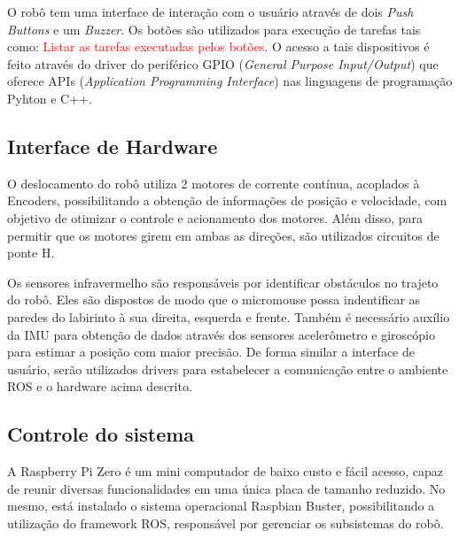 O robô tem uma interface de interação com o usuário através de dois \textit{Push Buttons} e um \textit{Buzzer}. Os botões são utilizados para execução de tarefas tais como: \textcolor{red}{Listar as tarefas executadas pelos botões}. O acesso a tais dispositivos é feito através do driver do periférico GPIO (\textit{General Purpose Input/Output}) que oferece APIs (\textit{Application Programming Interface}) nas linguagens de programação Pyhton e C++.

\subsection{Interface de Hardware}
\label{ssec:interface_de_hardware}
O deslocamento do robô utiliza 2 motores de corrente contínua, acoplados à Encoders, possibilitando a obtenção de informações de posição e velocidade, com objetivo de otimizar o controle e acionamento dos motores. Além disso, para permitir que os motores girem em ambas as direções, são utilizados circuitos de ponte H.
 
Os sensores infravermelho são responsáveis por identificar obstáculos no trajeto do robô. Eles são dispostos de modo que o micromouse possa indentificar as paredes do labirinto à sua direita, esquerda e frente. Também é necessário auxílio da IMU para obtenção de dados através dos sensores acelerômetro e giroscópio para estimar a posição com maior precisão. De forma similar a interface de usuário, serão utilizados drivers para estabelecer a comunicação entre o ambiente ROS e o hardware acima descrito.

\subsection{Controle do sistema}
\label{ssec:controle_do_sistema}
A Raspberry Pi Zero é um mini computador de baixo custo e fácil acesso, capaz de reunir diversas funcionalidades em uma única placa de tamanho reduzido.  No mesmo, está instalado o sistema operacional Raspbian Buster, possibilitando a utilização do framework ROS, responsável por gerenciar os subsistemas do robô.

